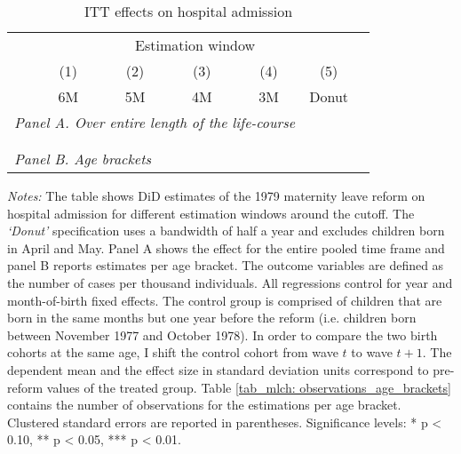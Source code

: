 \vspace*{\fill}
\begin{table}[H] \centering 
 \begin{threeparttable} \centering \caption{ITT effects on hospital admission}\label{tab_mlch: DD_hopsital2_total}
  {\def\sym#1{\ifmmode^{#1}\else\(^{#1}\)\fi} 
 	\begin{tabular}{l*{6}{c}}
 		\toprule 
 		& \multicolumn{5}{c}{Estimation window} \\ 
 		\cmidrule(lr){2-6}
 		&\multicolumn{1}{c}{(1)}&\multicolumn{1}{c}{(2)}&\multicolumn{1}{c}{(3)}&\multicolumn{1}{c}{(4)}&\multicolumn{1}{c}{(5)}\\
 		&\multicolumn{1}{c}{6M}&\multicolumn{1}{c}{5M}&\multicolumn{1}{c}{4M}&\multicolumn{1}{c}{3M}&\multicolumn{1}{c}{Donut}\\
 		\midrule
 		\multicolumn{5}{l}{\emph{Panel A. Over entire length of the life-course}} \\
 		 \\ \\
 		\multicolumn{5}{l}{\emph{Panel B. Age brackets}} \\
 		    
 		\bottomrule 
 	\end{tabular}}
 	\begin{tablenotes} 
 		\item \scriptsize \emph{Notes:} The table shows DiD estimates of the 1979 maternity leave reform on hospital admission for different estimation windows around the cutoff. The \textit{`Donut'} specification uses a bandwidth of half a year and excludes children born in April and May. Panel A shows the effect for the entire pooled time frame and panel B reports estimates per age bracket. The outcome variables are defined as the number of cases per thousand individuals. All regressions control for year and month-of-birth fixed effects. The control group is comprised of children that are born in the same months but one year before the reform (i.e. children born between November 1977 and October 1978). In order to compare the two birth cohorts at the same age, I shift the control cohort from wave $t$ to wave $t+1$. The dependent mean and the effect size in standard deviation units correspond to pre-reform values of the treated group. Table \ref{tab_mlch: observations_age_brackets} contains the number of observations for the estimations per age bracket. Clustered standard errors are reported in parentheses. \newline Significance levels: * p < 0.10, ** p < 0.05, *** p < 0.01. \newline 	%
 	\end{tablenotes} 
 \end{threeparttable} 
 \end{table}
\vspace*{\fill}\clearpage 